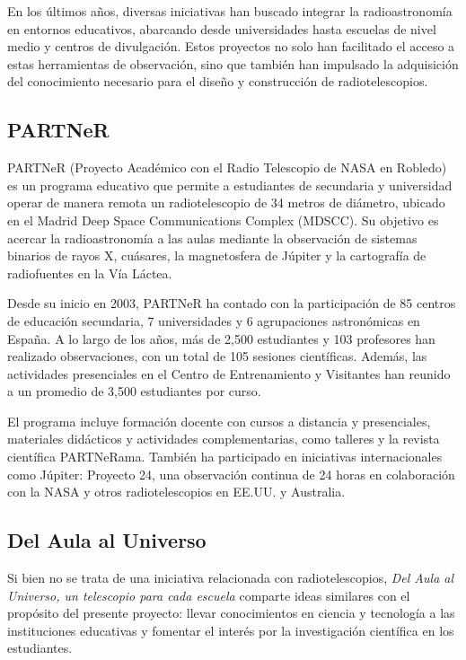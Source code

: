 En los últimos años, diversas iniciativas han buscado integrar la radioastronomía
en entornos educativos, abarcando desde universidades hasta escuelas de nivel
medio y centros de divulgación.
Estos proyectos no solo han facilitado el acceso a estas herramientas de
observación, sino que también han impulsado la adquisición del conocimiento
necesario para el diseño y construcción de radiotelescopios.

\subsection{PARTNeR}

PARTNeR (Proyecto Académico con el Radio Telescopio de NASA en Robledo) es
un programa educativo que permite a estudiantes de secundaria y universidad
operar de manera remota un radiotelescopio de 34 metros de diámetro, ubicado en
el Madrid Deep Space Communications Complex (MDSCC).
Su objetivo es acercar la radioastronomía a las aulas mediante la observación de
sistemas binarios de rayos X, cuásares, la magnetosfera de Júpiter y la cartografía
de radiofuentes en la Vía Láctea.

Desde su inicio en 2003, PARTNeR ha contado con la participación de 85 centros
de educación secundaria, 7 universidades y 6 agrupaciones astronómicas en España.
A lo largo de los años, más de 2,500 estudiantes y 103 profesores han realizado
observaciones, con un total de 105 sesiones científicas.
Además, las actividades presenciales en el Centro de Entrenamiento y Visitantes
han reunido a un promedio de 3,500 estudiantes por curso.

El programa incluye formación docente con cursos a distancia y presenciales,
materiales didácticos y actividades complementarias, como talleres y la revista
científica PARTNeRama.
También ha participado en iniciativas internacionales como Júpiter:
Proyecto 24, una observación continua de 24 horas en colaboración con la NASA y
otros radiotelescopios en EE.UU. y Australia. \parencite{Vaquerizo2010}

\subsection{Del Aula al Universo}

Si bien no se trata de una iniciativa relacionada con radiotelescopios,
\emph{Del Aula al Universo, un telescopio para cada escuela} comparte ideas
similares con el propósito del presente proyecto:
llevar conocimientos en ciencia y tecnología a las instituciones educativas y
fomentar el interés por la investigación científica en los estudiantes.

